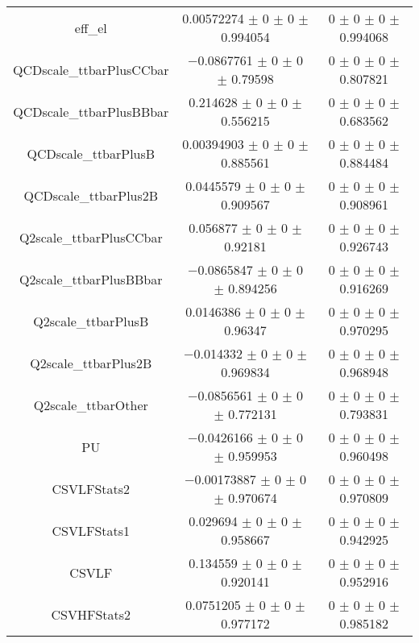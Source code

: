 \begin{table}
\begin{tabular}{ccc}
eff\_el & \num{0.00572274} $\pm$ \num{0} $\pm$ \num{0} $\pm$ \num{0.994054} & \num{0} $\pm$ \num{0} $\pm$ \num{0} $\pm$ \num{0.994068}\\
QCDscale\_ttbarPlusCCbar & \num{-0.0867761} $\pm$ \num{0} $\pm$ \num{0} $\pm$ \num{0.79598} & \num{0} $\pm$ \num{0} $\pm$ \num{0} $\pm$ \num{0.807821}\\
QCDscale\_ttbarPlusBBbar & \num{0.214628} $\pm$ \num{0} $\pm$ \num{0} $\pm$ \num{0.556215} & \num{0} $\pm$ \num{0} $\pm$ \num{0} $\pm$ \num{0.683562}\\
QCDscale\_ttbarPlusB & \num{0.00394903} $\pm$ \num{0} $\pm$ \num{0} $\pm$ \num{0.885561} & \num{0} $\pm$ \num{0} $\pm$ \num{0} $\pm$ \num{0.884484}\\
QCDscale\_ttbarPlus2B & \num{0.0445579} $\pm$ \num{0} $\pm$ \num{0} $\pm$ \num{0.909567} & \num{0} $\pm$ \num{0} $\pm$ \num{0} $\pm$ \num{0.908961}\\
Q2scale\_ttbarPlusCCbar & \num{0.056877} $\pm$ \num{0} $\pm$ \num{0} $\pm$ \num{0.92181} & \num{0} $\pm$ \num{0} $\pm$ \num{0} $\pm$ \num{0.926743}\\
Q2scale\_ttbarPlusBBbar & \num{-0.0865847} $\pm$ \num{0} $\pm$ \num{0} $\pm$ \num{0.894256} & \num{0} $\pm$ \num{0} $\pm$ \num{0} $\pm$ \num{0.916269}\\
Q2scale\_ttbarPlusB & \num{0.0146386} $\pm$ \num{0} $\pm$ \num{0} $\pm$ \num{0.96347} & \num{0} $\pm$ \num{0} $\pm$ \num{0} $\pm$ \num{0.970295}\\
Q2scale\_ttbarPlus2B & \num{-0.014332} $\pm$ \num{0} $\pm$ \num{0} $\pm$ \num{0.969834} & \num{0} $\pm$ \num{0} $\pm$ \num{0} $\pm$ \num{0.968948}\\
Q2scale\_ttbarOther & \num{-0.0856561} $\pm$ \num{0} $\pm$ \num{0} $\pm$ \num{0.772131} & \num{0} $\pm$ \num{0} $\pm$ \num{0} $\pm$ \num{0.793831}\\
PU & \num{-0.0426166} $\pm$ \num{0} $\pm$ \num{0} $\pm$ \num{0.959953} & \num{0} $\pm$ \num{0} $\pm$ \num{0} $\pm$ \num{0.960498}\\
CSVLFStats2 & \num{-0.00173887} $\pm$ \num{0} $\pm$ \num{0} $\pm$ \num{0.970674} & \num{0} $\pm$ \num{0} $\pm$ \num{0} $\pm$ \num{0.970809}\\
CSVLFStats1 & \num{0.029694} $\pm$ \num{0} $\pm$ \num{0} $\pm$ \num{0.958667} & \num{0} $\pm$ \num{0} $\pm$ \num{0} $\pm$ \num{0.942925}\\
CSVLF & \num{0.134559} $\pm$ \num{0} $\pm$ \num{0} $\pm$ \num{0.920141} & \num{0} $\pm$ \num{0} $\pm$ \num{0} $\pm$ \num{0.952916}\\
CSVHFStats2 & \num{0.0751205} $\pm$ \num{0} $\pm$ \num{0} $\pm$ \num{0.977172} & \num{0} $\pm$ \num{0} $\pm$ \num{0} $\pm$ \num{0.985182}\\

\end{tabular}
\end{table}
